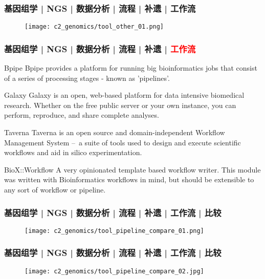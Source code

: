 \begin{frame}
  \frametitle{基因组学 | NGS | 数据分析 | 流程 | 补遗 | 工作流}
  \begin{figure}
    \centering
    \texttt{[image: c2\_genomics/tool\_other\_01.png]}
  \end{figure}
\end{frame}

\begin{frame}
  \frametitle{基因组学 | NGS | 数据分析 | 流程 | 补遗 | \textcolor{red}{工作流}}
  {\small
  \begin{block}{Bpipe}
    Bpipe provides a platform for running big bioinformatics jobs that consist of a series of processing stages - known as 'pipelines'.
  \end{block}
  \vspace{-0.4em}
  \pause
  \begin{block}{Galaxy}
    Galaxy is an open, web-based platform for data intensive biomedical research. Whether on the free public server or your own instance, you can perform, reproduce, and share complete analyses.
  \end{block}
  \vspace{-0.4em}
  \pause
  \begin{block}{Taverna}
    Taverna is an open source and domain-independent Workflow Management System –\ a suite of tools used to design and execute scientific workflows and aid in silico experimentation.
  \end{block}
  \vspace{-0.4em}
  \pause
  \begin{block}{BioX::Workflow}
    A very opinionated template based workflow writer. This module was written with Bioinformatics workflows in mind, but should be extensible to any sort of workflow or pipeline.
  \end{block}
}
\end{frame}

\begin{frame}
  \frametitle{基因组学 | NGS | 数据分析 | 流程 | 补遗 | 工作流 | 比较}
  \begin{figure}
    \centering
    \texttt{[image: c2\_genomics/tool\_pipeline\_compare\_01.png]}
  \end{figure}
\end{frame}

\begin{frame}
  \frametitle{基因组学 | NGS | 数据分析 | 流程 | 补遗 | 工作流 | 比较}
  \begin{figure}
    \centering
    \texttt{[image: c2\_genomics/tool\_pipeline\_compare\_02.jpg]}
  \end{figure}
\end{frame}

